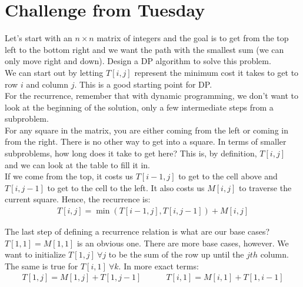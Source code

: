\documentclass[14pt]{extarticle}
\begin{document}
	\MakeScribeTop

    \section{Challenge from Tuesday}
    Let's start with an $n\times n$ matrix of integers and the goal is to get
    from the top left to the bottom right and we want the path with the
    smallest sum (we can only move right and down). Design a DP algorithm
    to solve this problem.\\

    We can start out by letting $T[i, j]$ represent the minimum cost it takes
    to get to row $i$ and column $j$. This is a good starting point for DP.\\
    
    For the recurrence, remember that with dynamic programming, we don't want
    to look at the beginning of the solution, only a few intermediate steps
    from a subproblem.\\

    For any square in the matrix, you are either coming from the left or coming
    in from the right. There is no other way to get into a square. In terms of
    smaller subproblems, how long does it take to get here? This is, by
    definition, $T[i, j]$ and we can look at the table to fill it in.\\

    If we come from the top, it costs us $T[i - 1, j]$ to get to the cell
    above and $T[i, j - 1]$ to get to the cell to the left. It also costs
    us $M[i,j]$ to traverse the current square. Hence, the recurrence is:
    \begin{align*}
        T[i,j] = \min\left(T[i-1,j], T[i,j-1]\right) + M[i,j]
    \end{align*}

    The last step of defining a recurrence relation is what are our base cases?
    $T[1, 1] = M[1,1]$ is an obvious one. There are more base cases, however.
    We want to initialize $T[1, j]\ \forall j$ to be the sum of the row up
    until the $jth$ column. The same is true for $T[i, 1]\ \forall k$. In
    more exact terms:
    \begin{align*}
        T[1, j] = M[1, j] + T[1, j - 1]
        \quad\quad\quad
        T[i, 1] = M[i, 1] + T[1, i - 1]
    \end{align*}
\end{document}
